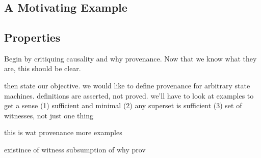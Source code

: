 \section{\WatProvenance{}}

\subsection{A Motivating Example}
%

{}

\subsection{\WatProvenance{}}

\subsection{Properties}

Begin by critiquing causality and why provenance. Now that we know what they are, this should be clear.

then state our objective. we would like to define provenance for arbitrary state machines.
definitions are asserted, not proved. we'll have to look at examples to get a sense
(1) sufficient and minimal
(2) any superset is sufficient
(3) set of witnesses, not just one thing

this is wat provenance
more examples

existince of witness
subsumption of why prov
